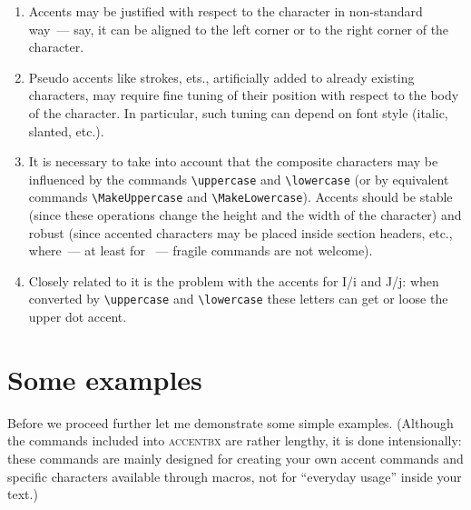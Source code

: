 \begin{enumerate}
{           known up to now which has such modificators.}.
\item
Accents may be justified with respect to the character
in non-standard way~--- say, it can be aligned to the left corner
or to the right corner of the character.
\item
Pseudo accents like strokes, ets., artificially added to already existing
characters, may require fine tuning of their position with respect
to the body of the character. In particular, such tuning
can depend on font style (italic, slanted, etc.).
\item
It is necessary to take into account that the composite characters may
be influenced by the commands \verb?\uppercase? and \verb?\lowercase?
(or by equivalent \LaTeXe{} commands \verb?\MakeUppercase?
and \verb?\MakeLowercase?). Accents should be stable (since these
operations change the height and the width of the character) and
robust (since accented characters may be placed inside section
headers, etc., where~--- at least for \LaTeXe{}~--- fragile commands
are not welcome).
\item
Closely related to it is the problem with the accents for I/i and
J/j: when converted by \verb?\uppercase? and \verb?\lowercase?
these letters can get or loose the upper dot accent.
\end{enumerate}

\section{Some examples\label{S-example}}

Before we proceed further let me demonstrate some simple examples.
(Although the commands included into \textsc{accentbx} are rather lengthy,
it is done intensionally: these commands are mainly designed for creating
your own accent commands and specific characters available through macros,
not for ``everyday usage'' inside your text.)

